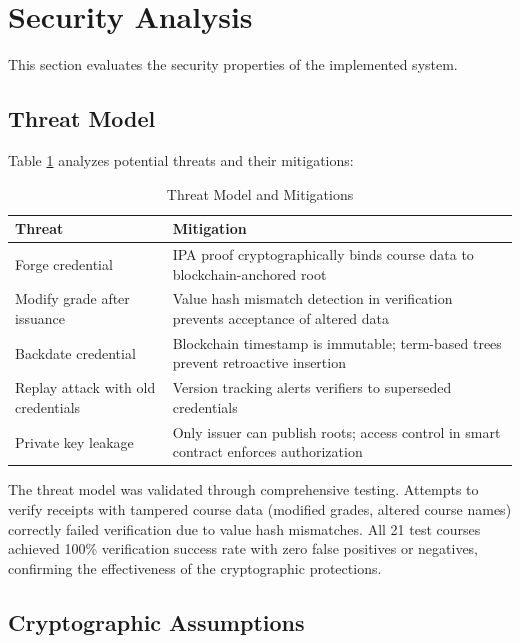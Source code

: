 \section{Security Analysis}
\label{sec:security-analysis}

This section evaluates the security properties of the implemented system.

\subsection{Threat Model}
\label{subsec:threat-model}

Table \ref{tab:threat-model} analyzes potential threats and their mitigations:

\begin{table}[H]
\centering
\caption{Threat Model and Mitigations}
\label{tab:threat-model}
\begin{tabular}{|p{5cm}|p{7cm}|}
\hline
\textbf{Threat} & \textbf{Mitigation} \\
\hline
Forge credential & IPA proof cryptographically binds course data to blockchain-anchored root \\
\hline
Modify grade after issuance & Value hash mismatch detection in verification prevents acceptance of altered data \\
\hline
Backdate credential & Blockchain timestamp is immutable; term-based trees prevent retroactive insertion \\
\hline
Replay attack with old credentials & Version tracking alerts verifiers to superseded credentials \\
\hline
Private key leakage & Only issuer can publish roots; access control in smart contract enforces authorization \\
\hline
\end{tabular}
\end{table}

The threat model was validated through comprehensive testing. Attempts to verify receipts with tampered course data (modified grades, altered course names) correctly failed verification due to value hash mismatches. All 21 test courses achieved 100\% verification success rate with zero false positives or negatives, confirming the effectiveness of the cryptographic protections.

\subsection{Cryptographic Assumptions}
\label{subsec:crypto-assumptions}

